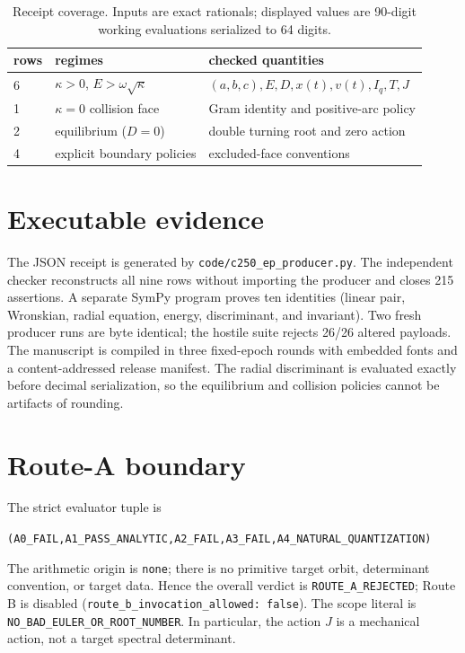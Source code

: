 \documentclass[10pt]{article}
\begin{document}
\begin{table}[htbp]
\centering\small
\caption{Receipt coverage.  Inputs are exact rationals; displayed values are
90-digit working evaluations serialized to 64 digits.}
\begin{tabular}{lll}
\toprule
rows & regimes & checked quantities\\
\midrule
6 & $\kappa>0$, $E>\omega\sqrt\kappa$ & $(a,b,c),E,D,x(t),v(t),I_q,T,J$\\
1 & $\kappa=0$ collision face & Gram identity and positive-arc policy\\
2 & equilibrium ($D=0$) & double turning root and zero action\\
4 & explicit boundary policies & excluded-face conventions\\
\bottomrule
\end{tabular}
\end{table}

\section{Executable evidence}
The JSON receipt is generated by
\texttt{code/c250\_ep\_producer.py}.  The independent checker reconstructs all
nine rows without importing the producer and closes 215 assertions.  A separate
SymPy program proves ten identities (linear pair, Wronskian, radial equation,
energy, discriminant, and invariant).  Two fresh producer runs are byte
identical; the hostile suite rejects 26/26 altered payloads.  The manuscript is
compiled in three fixed-epoch rounds with embedded fonts and a content-addressed
release manifest.
The radial discriminant is evaluated exactly before decimal serialization, so
the equilibrium and collision policies cannot be artifacts of rounding.

\section{Route-A boundary}
The strict evaluator tuple is
\begin{center}\small
\texttt{(A0\_FAIL,A1\_PASS\_ANALYTIC,A2\_FAIL,A3\_FAIL,A4\_NATURAL\_QUANTIZATION)}
\end{center}
The arithmetic origin is \texttt{none}; there is no primitive target orbit,
determinant convention, or target data.  Hence the overall verdict is
\texttt{ROUTE\_A\_REJECTED}; Route B is disabled
(\texttt{route\_b\_invocation\_allowed: false}).
The scope literal is \texttt{NO\_BAD\_EULER\_OR\_ROOT\_NUMBER}.  In particular,
the action \(J\) is a mechanical action, not a target spectral determinant.
\end{document}
